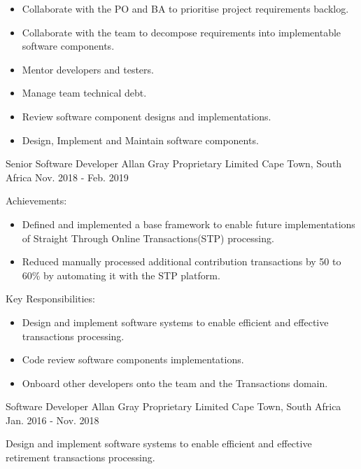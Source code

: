 \begin{cventries}
{\begin{cvitems}
        \begin{itemize}
          \item {Collaborate with the PO and BA to prioritise project requirements backlog.}
          \item {Collaborate with the team to decompose requirements into implementable software components.}
          \item {Mentor developers and testers.}
          \item {Manage team technical debt.}
          \item {Review software component designs and implementations.}
          \item {Design, Implement and Maintain software components.}
        \end{itemize}
      \end{cvitems}
    }

  \cventry
    {Senior Software Developer} %
    {Allan Gray Proprietary Limited} %
    {Cape Town, South Africa} %
    {Nov. 2018 - Feb. 2019} %
    {
      \begin{cvitems} %
        \item {Achievements:}
        \begin{itemize}
          \item {Defined and implemented a base framework to enable future implementations of Straight Through Online Transactions(STP) processing.}
          \item {Reduced manually processed additional contribution transactions by 50 to 60\% by automating it with the STP platform.}
        \end{itemize}
        \item {Key Responsibilities:}
        \begin{itemize}
          \item {Design and implement software systems to enable efficient and effective transactions processing.}
          \item {Code review software components implementations.}
          \item {Onboard other developers onto the team and the Transactions domain.}
        \end{itemize}
      \end{cvitems}
    }

  \cventry
    {Software Developer} %
    {Allan Gray Proprietary Limited} %
    {Cape Town, South Africa} %
    {Jan. 2016 - Nov. 2018} %
    {
      \begin{cvitems} %
          \item {Design and implement software systems to enable efficient and effective retirement transactions processing.}
      \end{cvitems}
    }


\end{cventries}
